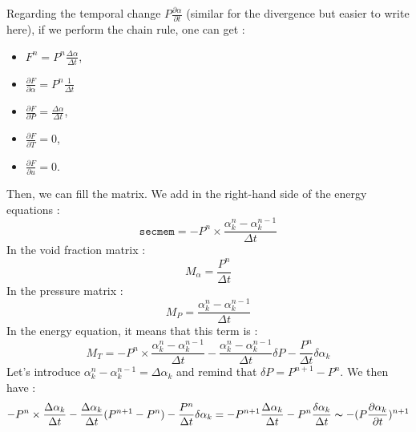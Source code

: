 Regarding the temporal change $P\frac{\partial \alpha}{\partial t}$ (similar for the divergence but easier to write here), if we perform the chain rule, one can get :
\begin{itemize}
    \item[\small \textcolor{blue}{\ding{109}}] $F^n=P^n\frac{\Delta \alpha}{\Delta t}$,
    \item[\small \textcolor{blue}{\ding{109}}] $\frac{\partial F}{\partial \alpha}=P^n\frac{1}{\Delta t}$
    \item[\small \textcolor{blue}{\ding{109}}] $\frac{\partial F}{\partial P}=\frac{\Delta \alpha}{\Delta t}$,
    \item[\small \textcolor{blue}{\ding{109}}] $\frac{\partial F}{\partial T}=0$,
    \item[\small \textcolor{blue}{\ding{109}}] $\frac{\partial F}{\partial u}=0$.
\end{itemize}
Then, we can fill the matrix. We add in the right-hand side of the energy equations :
\begin{equation}
    \texttt{secmem}=-P^n \times \frac{\alpha_k^n-\alpha_k^{n-1}}{\Delta t}
\end{equation}
In the void fraction matrix :
\begin{equation}
    M_\alpha=\frac{P^n}{\Delta t}
\end{equation}
In the pressure matrix :
\begin{equation}
    M_P=\frac{\alpha_k^n-\alpha_k^{n-1}}{\Delta t}
\end{equation}
In the energy equation, it means that this term is :
\begin{equation}
M_T=-P^n \times \frac{\alpha_k^n-\alpha_k^{n-1}}{\Delta t}-\frac{\alpha_k^n-\alpha_k^{n-1}}{\Delta t}\delta P - \frac{P^n}{\Delta t}\delta \alpha_k 
\end{equation}
Let's introduce $\alpha_k^n-\alpha_k^{n-1}=\Delta \alpha_k$ and remind that $\delta P =P^{n+1}-P^n$. We then have :
\begin{equation}
-P^n \times \frac{\Delta \alpha_k}{\Delta t}-\frac{\Delta \alpha_k}{\Delta t}(P^{n+1}-P^n) - \frac{P^n}{\Delta t}\delta \alpha_k = -P^{n+1}\frac{\Delta \alpha_k}{\Delta t}-P^n\frac{\delta \alpha_k}{\Delta t} \thicksim -(P\frac{\partial \alpha_k}{\partial t})^{n+1}
 \end{equation}

